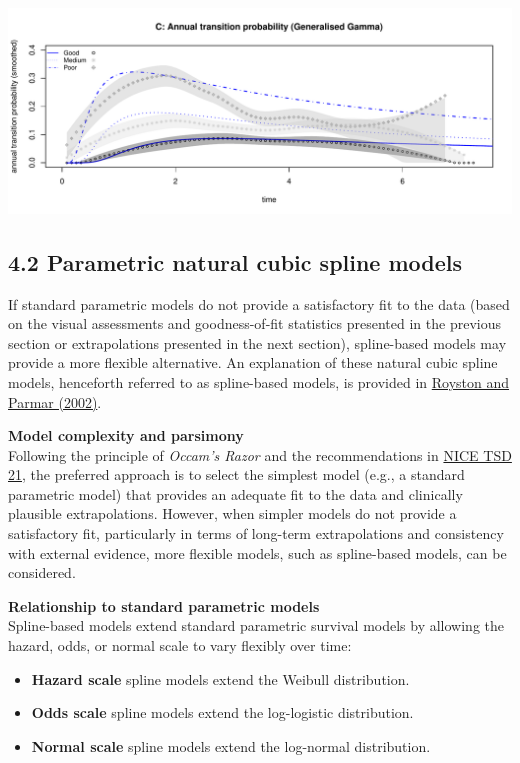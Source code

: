 \documentclass[
]{article}
\providecommand{\tightlist}{%
  \setlength{\itemsep}{0pt}\setlength{\parskip}{0pt}}
\begin{document}
\begin{flushleft}\includegraphics[height=0.25\textheight]{BC_OS_output/Images/Figure_param_models-21} \end{flushleft}

\clearpage

\subsection{4.2 Parametric natural cubic spline
models}\label{parametric-natural-cubic-spline-models}

If standard parametric models do not provide a satisfactory fit to the
data (based on the visual assessments and goodness-of-fit statistics
presented in the previous section or extrapolations presented in the
next section), spline-based models may provide a more flexible
alternative. An explanation of these natural cubic spline models,
henceforth referred to as spline-based models, is provided in
\href{https://doi.org/10.1002/sim.1203}{Royston and Parmar (2002)}.

\textbf{Model complexity and parsimony}\\
Following the principle of \emph{Occam's Razor} and the recommendations
in
\href{https://www.sheffield.ac.uk/media/34188/download?attachment}{NICE
TSD 21}, the preferred approach is to select the simplest model (e.g., a
standard parametric model) that provides an adequate fit to the data and
clinically plausible extrapolations. However, when simpler models do not
provide a satisfactory fit, particularly in terms of long-term
extrapolations and consistency with external evidence, more flexible
models, such as spline-based models, can be considered.

\textbf{Relationship to standard parametric models}\\
Spline-based models extend standard parametric survival models by
allowing the hazard, odds, or normal scale to vary flexibly over time:

\begin{itemize}
\tightlist
\item
  \textbf{Hazard scale} spline models extend the Weibull distribution.\\
\item
  \textbf{Odds scale} spline models extend the log-logistic
  distribution.\\
\item
  \textbf{Normal scale} spline models extend the log-normal
  distribution.
\end{itemize}
\end{document}
